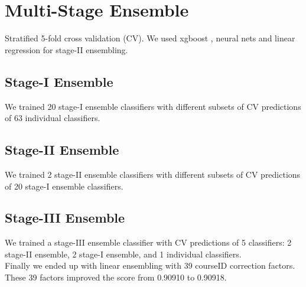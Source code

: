 \section{Multi-Stage Ensemble}
Stratified 5-fold cross validation (CV).
We used xgboost \cite{xgboost}, neural nets and linear regression for stage-II ensembling.

\subsection{Stage-I Ensemble}
We trained 20 stage-I ensemble classifiers with different subsets of CV predictions of 63 individual classifiers.

\subsection{Stage-II Ensemble}
We trained 2 stage-II ensemble classifiers with different subsets of CV predictions of 20 stage-I ensemble classifiers.

\subsection{Stage-III Ensemble}
We trained a stage-III ensemble classifier with CV predictions of 5 classifiers: 2 stage-II ensemble, 2 stage-I ensemble, and 1 individual classifiers.
\\

Finally we ended up with linear ensembling with 39 courseID correction factors.
These 39 factors improved the score from 0.90910 to 0.90918.